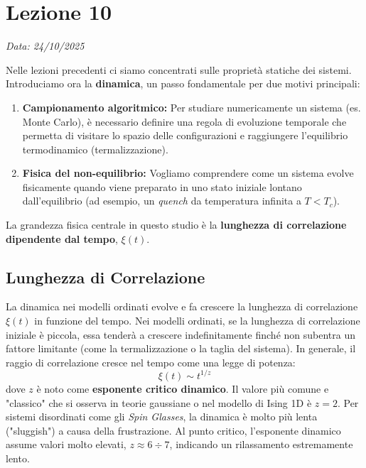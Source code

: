 \chapter{Lezione 10} \label{chap:lezione_10}
\begin{flushright}
\textit{Data: 24/10/2025} 
\end{flushright}

Nelle lezioni precedenti ci siamo concentrati sulle proprietà statiche dei sistemi. Introduciamo ora la \textbf{dinamica}, un passo fondamentale per due motivi principali:
\begin{enumerate}
    \item \textbf{Campionamento algoritmico:} Per studiare numericamente un sistema (es. Monte Carlo), è necessario definire una regola di evoluzione temporale che permetta di visitare lo spazio delle configurazioni e raggiungere l'equilibrio termodinamico (termalizzazione).
    \item \textbf{Fisica del non-equilibrio:} Vogliamo comprendere come un sistema evolve fisicamente quando viene preparato in uno stato iniziale lontano dall'equilibrio (ad esempio, un \textit{quench} da temperatura infinita a $T < T_c$).
\end{enumerate}

La grandezza fisica centrale in questo studio è la \textbf{lunghezza di correlazione dipendente dal tempo}, $\xi(t)$.

\section{ Lunghezza di Correlazione}
La dinamica nei modelli ordinati evolve e fa crescere la lunghezza di correlazione $\xi(t)$ in funzione del tempo. Nei modelli ordinati, se la lunghezza di correlazione iniziale è piccola, essa tenderà a crescere indefinitamente finché non subentra un fattore limitante (come la termalizzazione o la taglia del sistema).
In generale, il raggio di correlazione cresce nel tempo come una legge di potenza:
\begin{equation}
\xi(t) \sim t^{1/z}
\end{equation}
dove $z$ è noto come \textbf{esponente critico dinamico}. Il valore più comune e "classico" che si osserva in teorie gaussiane o nel modello di Ising 1D è $z=2$. Per sistemi disordinati come gli \textit{Spin Glasses}, la dinamica è molto più lenta ("sluggish") a causa della frustrazione. Al punto critico, l'esponente dinamico assume valori molto elevati, $z \approx 6 \div 7$, indicando un rilassamento estremamente lento.

